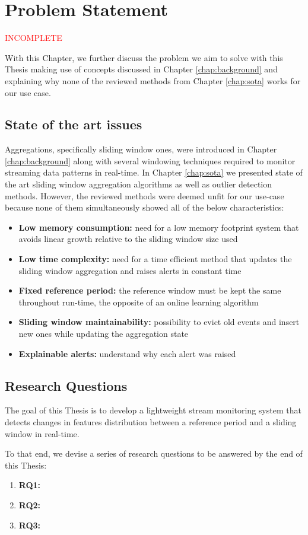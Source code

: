 \chapter{Problem Statement} \label{chap:statement} \minitoc

\textcolor{red}{INCOMPLETE}

With this Chapter, we further discuss the problem we aim to solve with this Thesis making use of concepts discussed in Chapter \ref{chap:background} and explaining why none of the reviewed methods from Chapter \ref{chap:sota} works for our use case.

\section{State of the art issues}
Aggregations, specifically sliding window ones, were introduced in Chapter \ref{chap:background} along with several windowing techniques required to monitor streaming data patterns in real-time. In Chapter \ref{chap:sota} we presented state of the art sliding window aggregation algorithms as well as outlier detection methods. However, the reviewed methods were deemed unfit for our use-case because none of them simultaneously showed all of the below characteristics:

\begin{itemize}
    \item \textbf{Low memory consumption:} need for a low memory footprint system that avoids linear growth relative to the sliding window size used
    
    \item \textbf{Low time complexity:} need for a time efficient method that updates the sliding window aggregation and raises alerts in constant time
    
    \item \textbf{Fixed reference period:} the reference window must be kept the same throughout run-time, the opposite of an online learning algorithm
    
    \item \textbf{Sliding window maintainability:} possibility to evict old events and insert new ones while updating the aggregation state
    
    \item \textbf{Explainable alerts:} understand why each alert was raised
\end{itemize}


\section{Research Questions}
The goal of this Thesis is to develop a lightweight stream monitoring system that detects changes in features distribution between a reference period and a sliding window in real-time.

To that end, we devise a series of research questions to be answered by the end of this Thesis:

\begin{enumerate}
    \item \textbf{RQ1:}
    \item \textbf{RQ2:}
    \item \textbf{RQ3:}
\end{enumerate}